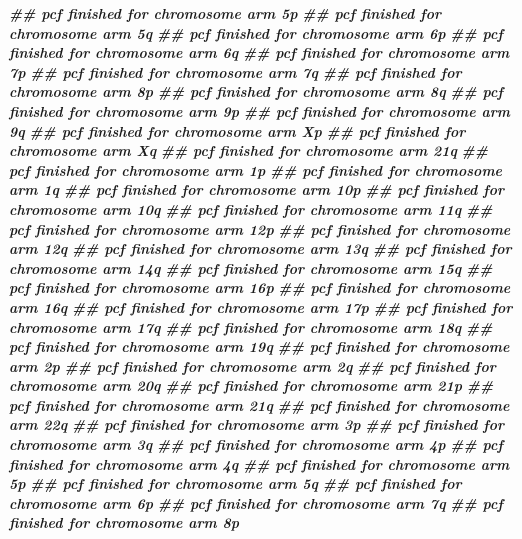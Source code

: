 \documentclass[
  12pt,
  a4paper,
  twoside]{book}
\newenvironment{Shaded}{\begin{snugshade}}{\end{snugshade}}
\newcommand{\DocumentationTok}[1]{\textcolor[rgb]{0.56,0.35,0.01}{\textbf{\textit{#1}}}}
\begin{document}
\begin{Shaded}
\begin{Highlighting}[]
\DocumentationTok{\#\# pcf finished for chromosome arm 5p }
\DocumentationTok{\#\# pcf finished for chromosome arm 5q }
\DocumentationTok{\#\# pcf finished for chromosome arm 6p }
\DocumentationTok{\#\# pcf finished for chromosome arm 6q }
\DocumentationTok{\#\# pcf finished for chromosome arm 7p }
\DocumentationTok{\#\# pcf finished for chromosome arm 7q }
\DocumentationTok{\#\# pcf finished for chromosome arm 8p }
\DocumentationTok{\#\# pcf finished for chromosome arm 8q }
\DocumentationTok{\#\# pcf finished for chromosome arm 9p }
\DocumentationTok{\#\# pcf finished for chromosome arm 9q }
\DocumentationTok{\#\# pcf finished for chromosome arm Xp }
\DocumentationTok{\#\# pcf finished for chromosome arm Xq }
\DocumentationTok{\#\# pcf finished for chromosome arm 21q }
\DocumentationTok{\#\# pcf finished for chromosome arm 1p }
\DocumentationTok{\#\# pcf finished for chromosome arm 1q }
\DocumentationTok{\#\# pcf finished for chromosome arm 10p }
\DocumentationTok{\#\# pcf finished for chromosome arm 10q }
\DocumentationTok{\#\# pcf finished for chromosome arm 11q }
\DocumentationTok{\#\# pcf finished for chromosome arm 12p }
\DocumentationTok{\#\# pcf finished for chromosome arm 12q }
\DocumentationTok{\#\# pcf finished for chromosome arm 13q }
\DocumentationTok{\#\# pcf finished for chromosome arm 14q }
\DocumentationTok{\#\# pcf finished for chromosome arm 15q }
\DocumentationTok{\#\# pcf finished for chromosome arm 16p }
\DocumentationTok{\#\# pcf finished for chromosome arm 16q }
\DocumentationTok{\#\# pcf finished for chromosome arm 17p }
\DocumentationTok{\#\# pcf finished for chromosome arm 17q }
\DocumentationTok{\#\# pcf finished for chromosome arm 18q }
\DocumentationTok{\#\# pcf finished for chromosome arm 19q }
\DocumentationTok{\#\# pcf finished for chromosome arm 2p }
\DocumentationTok{\#\# pcf finished for chromosome arm 2q }
\DocumentationTok{\#\# pcf finished for chromosome arm 20q }
\DocumentationTok{\#\# pcf finished for chromosome arm 21p }
\DocumentationTok{\#\# pcf finished for chromosome arm 21q }
\DocumentationTok{\#\# pcf finished for chromosome arm 22q }
\DocumentationTok{\#\# pcf finished for chromosome arm 3p }
\DocumentationTok{\#\# pcf finished for chromosome arm 3q }
\DocumentationTok{\#\# pcf finished for chromosome arm 4p }
\DocumentationTok{\#\# pcf finished for chromosome arm 4q }
\DocumentationTok{\#\# pcf finished for chromosome arm 5p }
\DocumentationTok{\#\# pcf finished for chromosome arm 5q }
\DocumentationTok{\#\# pcf finished for chromosome arm 6p }
\DocumentationTok{\#\# pcf finished for chromosome arm 7q }
\DocumentationTok{\#\# pcf finished for chromosome arm 8p }

\end{Highlighting}
\end{Shaded}
\end{document}
